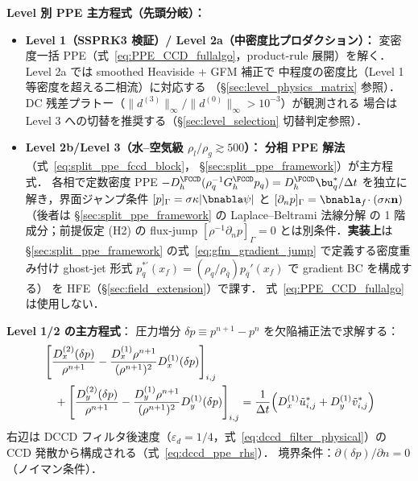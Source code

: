\begin{tcolorbox}[algbox, title={1 タイムステップ $t^n \to t^{n+1}$ の完全アルゴリズム}]
\noindent\textbf{Level 別 PPE 主方程式（先頭分岐）：}
\begin{itemize}[noitemsep,leftmargin=2em]
  \item \textbf{Level 1（SSPRK3 検証）/ Level 2a（中密度比プロダクション）：}
        変密度一括 PPE（式~\eqref{eq:PPE_CCD_fullalgo}，product-rule 展開）を解く．
        Level 2a では smoothed Heaviside + GFM 補正で
        中程度の密度比（Level 1 等密度を超える二相流）に対応する
        （\S\ref{sec:level_physics_matrix} 参照）．
        DC 残差プラトー（$\|d^{(3)}\|_\infty/\|d^{(0)}\|_\infty > 10^{-3}$）が観測される
        場合は Level 3 への切替を推奨する（§\ref{sec:level_selection} 切替判定参照）．
  \item \textbf{Level 2b/Level 3（水--空気級 $\rho_l/\rho_g\gtrsim 500$）：}
        \textbf{分相 PPE 解法}（式~\eqref{eq:split_ppe_fccd_block}，
        §\ref{sec:split_ppe_framework}）が主方程式．
        各相で定数密度 PPE
        $-D_h^\FCCD(\rho_q^{-1}G_h^\FCCD p_q) = D_h^\FCCD\bu_q^*/\Delta t$
        を独立に解き，界面ジャンプ条件 $[p]_\Gamma=\sigma\kappa|\bnabla\psi|$ と
        $[\partial_n p]_\Gamma=\bnabla_f\!\cdot(\sigma\kappa\mathbf{n})$
        （後者は \S\ref{sec:split_ppe_framework} の Laplace--Beltrami 法線分解
        の 1 階成分；前提仮定 (H2) の flux-jump $[\rho^{-1}\partial_n p]_\Gamma=0$
        とは別条件．\textbf{実装上}は \S\ref{sec:split_ppe_framework}
        の式~\eqref{eq:gfm_gradient_jump} で定義する密度重み付け ghost-jet 形式
        $p_q^{*\prime}(x_f)=(\rho_q/\rho_{\bar q})p_{\bar q}'(x_f)$ で gradient BC を構成する）
        を HFE（§\ref{sec:field_extension}）で課す．
        式~\eqref{eq:PPE_CCD_fullalgo} は使用しない．
\end{itemize}

\noindent\textbf{Level 1/2 の主方程式}：
圧力増分 $\delta p \equiv p^{n+1} - p^n$ を欠陥補正法で求解する：
\begin{equation}
\begin{aligned}
  &\left[
    \frac{D_x^{(2)}(\delta p)}{\rho^{n+1}}
    - \frac{D_x^{(1)}\rho^{n+1}}{(\rho^{n+1})^2}
      D_x^{(1)}(\delta p)
  \right]_{i,j} \\
  &\quad+
  \left[
    \frac{D_y^{(2)}(\delta p)}{\rho^{n+1}}
    - \frac{D_y^{(1)}\rho^{n+1}}{(\rho^{n+1})^2}
      D_y^{(1)}(\delta p)
  \right]_{i,j}
  =
  \frac{1}{\Delta t}
  \Bigl(D_x^{(1)}\tilde{u}^*_{i,j}
        + D_y^{(1)}\tilde{v}^*_{i,j}\Bigr)
\end{aligned}
  \label{eq:PPE_CCD_fullalgo}
\end{equation}
右辺は DCCD フィルタ後速度（$\varepsilon_d=1/4$，式~\eqref{eq:dccd_filter_physical}）の
CCD 発散から構成される（式~\eqref{eq:dccd_ppe_rhs}）．
境界条件：$\partial(\delta p)/\partial n = 0$（ノイマン条件）．


\end{tcolorbox}
